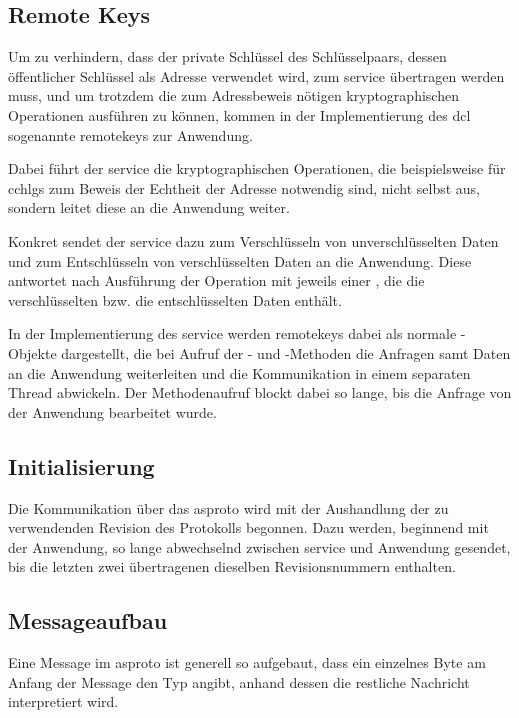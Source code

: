 \subsection{Remote Keys}
\label{dcl-asproto-remotekeys}
Um zu verhindern, dass der private Schlüssel des Schlüsselpaars, dessen
öffentlicher Schlüssel als Adresse verwendet wird, zum \gls{service} übertragen
werden muss, und um trotzdem die zum Adressbeweis nötigen kryptographischen
Operationen ausführen zu können, kommen in der Implementierung des \gls{dcl}
sogenannte \glspl{remotekey} zur Anwendung.

Dabei führt der \gls{service} die kryptographischen Operationen, die
beispielsweise für \glspl{cchlg} zum Beweis der Echtheit der Adresse notwendig
sind, nicht selbst aus, sondern leitet diese an die Anwendung weiter.

Konkret sendet der \gls{service} dazu \msgpl{\asprotokeyenc} zum Verschlüsseln
von unverschlüsselten Daten und \msgpl{\asprotokeydec} zum Entschlüsseln von
verschlüsselten Daten an die Anwendung. Diese antwortet nach Ausführung der
Operation mit jeweils einer \msg{\asprotocryptoresponse}, die die
verschlüsselten bzw. die entschlüsselten Daten enthält.

In der Implementierung des \gls{service} werden \glspl{remotekey} dabei als
normale -Objekte dargestellt, die bei Aufruf der - und
-Methoden die Anfragen samt Daten an die Anwendung weiterleiten
und die Kommunikation in einem separaten Thread abwickeln.
Der Methodenaufruf blockt dabei so lange, bis die Anfrage von der Anwendung
bearbeitet wurde.

\subsection{Initialisierung}
Die Kommunikation über das \gls{asproto} wird mit der Aushandlung der zu
verwendenden Revision des Protokolls begonnen.
Dazu werden, beginnend mit der Anwendung, so lange \msgpl{\asprotorevision}
abwechselnd zwischen \gls{service} und Anwendung gesendet, bis die letzten
zwei übertragenen \msgpl{\asprotorevision} dieselben Revisionsnummern
enthalten.

\subsection{Messageaufbau}
Eine Message im \gls{asproto} ist generell so aufgebaut, dass ein einzelnes Byte
am Anfang der Message den Typ angibt, anhand dessen die restliche Nachricht
interpretiert wird.

